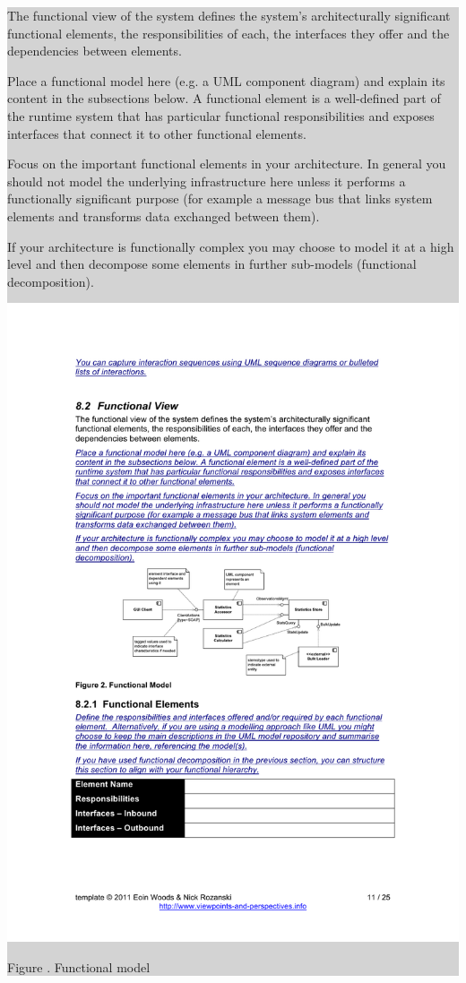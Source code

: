 \documentclass[a4paper,11pt]{report}
\newcommand{\instructions}[1]{
  \noindent\colorbox{lightgray}{%
    \parbox{\linewidth}{%
      #1
    }%
  }%
 \vspace{0.1cm}
}
\newcommand{\mycaption}[1]{
  \addtocounter{figures}{1}
  Figure \arabic{figures}. #1
}
\begin{document}
\instructions{
The functional view of the system defines the system’s architecturally
significant functional elements, the responsibilities of each, the
interfaces they offer and the dependencies between elements.

Place a functional model here (e.g. a UML component diagram) and
explain its content in the subsections below. A functional element is
a well-defined part of the runtime system that has particular
functional responsibilities and exposes interfaces that connect it to
other functional elements.


Focus on the important functional elements in your architecture. In
general you should not model the underlying infrastructure here unless
it performs a functionally significant purpose (for example a message
bus that links system elements and transforms data exchanged between
them).

If your architecture is functionally complex you may choose to model
it at a high level and then decompose some elements in further
sub-models (functional decomposition).

\begin{center}
  \includegraphics[width=\textwidth]{figures/functionalmodel}\\
  \mycaption{Functional model}
\end{center}

}
\end{document}
